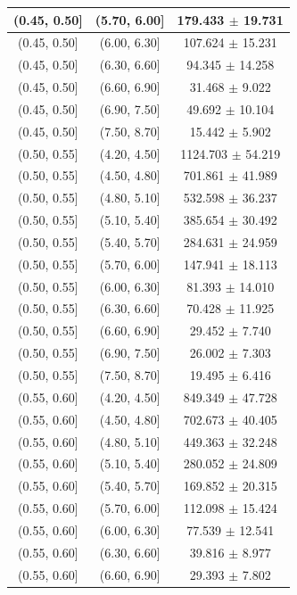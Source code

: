 \begin{longtable}{|c|c|c|}
\hline
(0.45, 0.50] & (5.70, 6.00] & 179.433 $\pm$ 19.731 \\ 
\hline
(0.45, 0.50] & (6.00, 6.30] & 107.624 $\pm$ 15.231 \\ 
\hline
(0.45, 0.50] & (6.30, 6.60] & 94.345 $\pm$ 14.258 \\ 
\hline
(0.45, 0.50] & (6.60, 6.90] & 31.468 $\pm$ 9.022 \\ 
\hline
(0.45, 0.50] & (6.90, 7.50] & 49.692 $\pm$ 10.104 \\ 
\hline
(0.45, 0.50] & (7.50, 8.70] & 15.442 $\pm$ 5.902 \\ 
\hline
(0.50, 0.55] & (4.20, 4.50] & 1124.703 $\pm$ 54.219 \\ 
\hline
(0.50, 0.55] & (4.50, 4.80] & 701.861 $\pm$ 41.989 \\ 
\hline
(0.50, 0.55] & (4.80, 5.10] & 532.598 $\pm$ 36.237 \\ 
\hline
(0.50, 0.55] & (5.10, 5.40] & 385.654 $\pm$ 30.492 \\ 
\hline
(0.50, 0.55] & (5.40, 5.70] & 284.631 $\pm$ 24.959 \\ 
\hline
(0.50, 0.55] & (5.70, 6.00] & 147.941 $\pm$ 18.113 \\ 
\hline
(0.50, 0.55] & (6.00, 6.30] & 81.393 $\pm$ 14.010 \\ 
\hline
(0.50, 0.55] & (6.30, 6.60] & 70.428 $\pm$ 11.925 \\ 
\hline
(0.50, 0.55] & (6.60, 6.90] & 29.452 $\pm$ 7.740 \\ 
\hline
(0.50, 0.55] & (6.90, 7.50] & 26.002 $\pm$ 7.303 \\ 
\hline
(0.50, 0.55] & (7.50, 8.70] & 19.495 $\pm$ 6.416 \\ 
\hline
(0.55, 0.60] & (4.20, 4.50] & 849.349 $\pm$ 47.728 \\ 
\hline
(0.55, 0.60] & (4.50, 4.80] & 702.673 $\pm$ 40.405 \\ 
\hline
(0.55, 0.60] & (4.80, 5.10] & 449.363 $\pm$ 32.248 \\ 
\hline
(0.55, 0.60] & (5.10, 5.40] & 280.052 $\pm$ 24.809 \\ 
\hline
(0.55, 0.60] & (5.40, 5.70] & 169.852 $\pm$ 20.315 \\ 
\hline
(0.55, 0.60] & (5.70, 6.00] & 112.098 $\pm$ 15.424 \\ 
\hline
(0.55, 0.60] & (6.00, 6.30] & 77.539 $\pm$ 12.541 \\ 
\hline
(0.55, 0.60] & (6.30, 6.60] & 39.816 $\pm$ 8.977 \\ 
\hline
(0.55, 0.60] & (6.60, 6.90] & 29.393 $\pm$ 7.802 \\ 

\end{longtable}

